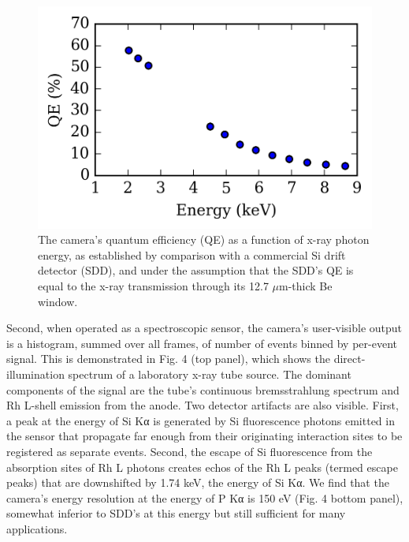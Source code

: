 \begin{figure}[h] \label{cmos25}
\caption{
The camera's quantum efficiency (QE) as a function of
x-ray photon energy, as established by comparison with a commercial Si
drift detector (SDD), and under the assumption that the SDD's QE is equal to the x-ray transmission through its 12.7 $\mu$m-thick Be window.
}
\centering
\includegraphics{NewCameraPaper_1.10.docx1502867018/media/image5.png}
\end{figure}


Second, when operated as a spectroscopic sensor, the camera's
user-visible output is a histogram, summed over all frames, of number of
events binned by per-event signal. This is demonstrated in Fig. 4 (top
panel), which shows the direct-illumination spectrum of a laboratory
x-ray tube source. The dominant components of the signal are the tube's
continuous bremsstrahlung spectrum and Rh L-shell emission from the
anode. Two detector artifacts are also visible. First, a peak at the
energy of Si Kα is generated by Si fluorescence photons emitted in the
sensor that propagate far enough from their originating interaction
sites to be registered as separate events. Second, the escape of Si
fluorescence from the absorption sites of Rh L photons creates echos of
the Rh L peaks (termed escape peaks) that are downshifted by 1.74 keV,
the energy of Si Kα. We find that the camera's energy resolution at the
energy of P Kα is 150 eV (Fig. 4 bottom panel), somewhat inferior to
SDD's at this energy but still sufficient for many applications.

\FloatBarrier

